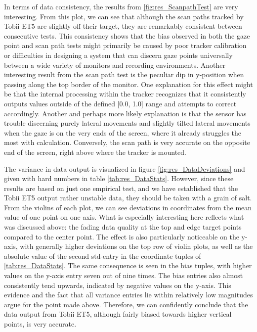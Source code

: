 In terms of data consistency, the results from \ref{fig:res_ScanpathTest} are very interesting. From this plot, we can see that although the scan paths tracked by Tobii ET5 are slightly off their target, they are remarkably consistent between consecutive tests. This consistency shows that the bias observed in both the gaze point and scan path tests might primarily be caused by poor tracker calibration or difficulties in designing a system that can discern gaze points universally between a wide variety of monitors and recording environments. Another interesting result from the scan path test is the peculiar dip in y-position when passing along the top border of the monitor. One explanation for this effect might be that the internal processing within the tracker recognizes that it consistently outputs values outside of the defined [0.0, 1.0] range and attempts to correct accordingly. Another and perhaps more likely explanation is that the sensor has trouble discerning purely lateral movements and slightly tilted lateral movements when the gaze is on the very ends of the screen, where it already struggles the most with calculation. Conversely, the scan path is very accurate on the opposite end of the screen, right above where the tracker is mounted.

The variance in data output is visualized in figure \ref{fig:res_DataDeviations} and given with hard numbers in table \ref{tab:res_DataStats}. However, since these results are based on just one empirical test, and we have established that the Tobii ET5 output rather unstable data, they should be taken with a grain of salt. From the violins of each plot, we can see deviations in coordinates from the mean value of one point on one axis. What is especially interesting here reflects what was discussed above: the fading data quality at the top and edge target points compared to the center point. The effect is also particularly noticeable on the y-axis, with generally higher deviations on the top row of violin plots, as well as the absolute value of the second std-entry in the coordinate tuples of \ref{tab:res_DataStats}. The same consequence is seen in the bias tuples, with higher values on the y-axis entry seven out of nine times. The bias entries also almost consistently tend upwards, indicated by negative values on the y-axis. This evidence and the fact that all variance entries lie within relatively low magnitudes argue for the point made above. Therefore, we can confidently conclude that the data output from Tobii ET5, although fairly biased towards higher vertical points, is very accurate.

